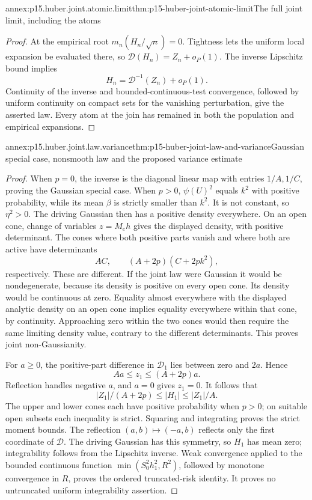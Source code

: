 \begin{annexitem}{annex:p15.huber.joint.atomic.limit}{thm:p15-huber-joint-atomic-limit}{The full joint limit, including the atoms}
\begin{proof}
At the empirical root \(m_n(H_n/\sqrt n)=0\).
Tightness lets the uniform local expansion be evaluated there,
so \(\mathcal D(H_n)=Z_n+o_P(1)\).
The inverse Lipschitz bound implies
\[
                   H_n=\mathcal D^{-1}(Z_n)+o_P(1).
\]
Continuity of the inverse and bounded-continuous-test convergence,
followed by uniform continuity on compact sets for the vanishing
perturbation, give the asserted law. Every atom at the join has
remained in both the population and empirical expansions.
\end{proof}
\end{annexitem}

\begin{annexitem}{annex:p15.huber.joint.law.variance}{thm:p15-huber-joint-law-and-variance}{Gaussian special case, nonsmooth law and the proposed variance estimate}
\begin{proof}
When \(p=0\), the inverse is the diagonal linear map with entries
\(1/A,1/C\), proving the Gaussian special case.
When \(p>0\), \(\psi(U)^2\) equals \(k^2\) with positive probability,
while its mean \(\beta\) is strictly smaller than \(k^2\).
It is not constant, so \(\eta^2>0\).
The driving Gaussian then has a positive density everywhere.
On an open cone, change of variables \(z=M_eh\) gives the
displayed density, with positive determinant.
The cones where both positive parts vanish and where both
are active have determinants
\[
                AC,\qquad (A+2p)(C+2pk^2),
\]
respectively. These are different.
If the joint law were Gaussian it would be nondegenerate, because
its density is positive on every open cone. Its density would
be continuous at zero. Equality almost everywhere with the
displayed analytic density on an open cone implies equality
everywhere within that cone, by continuity.
Approaching zero within the two cones would then require the
same limiting density value, contrary to the different determinants.
This proves joint non-Gaussianity.

For \(a\geq0\), the positive-part difference in \(\mathcal D_1\)
lies between zero and \(2a\). Hence
\[
                       Aa\leq z_1\leq(A+2p)a.
\]
Reflection handles negative \(a\), and \(a=0\) gives \(z_1=0\).
It follows that
\[
 |Z_1|/(A+2p)\leq |H_1|\leq |Z_1|/A .
\]
The upper and lower cones each have positive probability when
\(p>0\); on suitable open subsets each inequality is strict.
Squaring and integrating proves the strict moment bounds.
The reflection \((a,b)\mapsto(-a,b)\) reflects only the first
coordinate of \(\mathcal D\). The driving Gaussian has this
symmetry, so \(H_1\) has mean zero; integrability follows from
the Lipschitz inverse. Weak convergence applied to the bounded
continuous function \(\min(S_0^2h_1^2,R^2)\), followed by
monotone convergence in \(R\), proves the ordered truncated-risk
identity. It proves no untruncated uniform integrability assertion.


\end{proof}
\end{annexitem}

